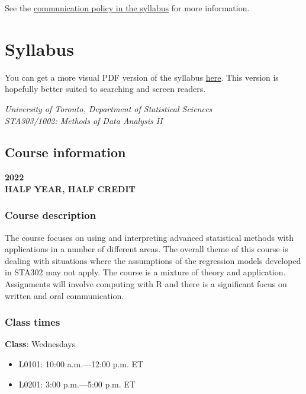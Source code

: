 \documentclass[
  openany]{book}
\providecommand{\tightlist}{%
  \setlength{\itemsep}{0pt}\setlength{\parskip}{0pt}}
\begin{document}
See the \protect\hyperlink{communication-policy}{communication policy in the syllabus} for more information.

\hypertarget{syllabus}{%
\chapter{Syllabus}\label{syllabus}}

You can get a more visual PDF version of the syllabus \href{https://sta303-bolton.github.io/sta303-w22-courseguide/other-files/STA303-1002_W22_syllabus.pdf}{here}. This version is hopefully better suited to searching and screen readers.

\emph{University of Toronto, Department of Statistical Sciences}\\
\emph{STA303/1002: Methods of Data Analysis II}

\hypertarget{course-information}{%
\section{Course information}\label{course-information}}

\textbf{2022}\\
\textbf{HALF YEAR, HALF CREDIT}

\hypertarget{course-description}{%
\subsection{Course description}\label{course-description}}

The course focuses on using and interpreting advanced statistical methods with applications in a number of different areas. The overall theme of this course is dealing with situations where the assumptions of the regression models developed in STA302 may not apply. The course is a mixture of theory and application. Assignments will involve computing with R and there is a significant focus on written and oral communication.

\hypertarget{class-times}{%
\subsection{Class times}\label{class-times}}

\textbf{Class}: Wednesdays

\begin{itemize}
\tightlist
\item
  L0101: 10:00 a.m.---12:00 p.m. ET
\item
  L0201: 3:00 p.m.---5:00 p.m. ET
\end{itemize}
\end{document}

